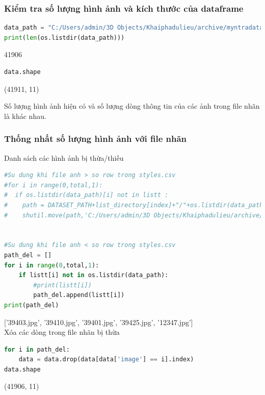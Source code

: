 \subsubsection{Kiểm tra số lượng hình ảnh và kích thước của dataframe}
\begin{lstlisting}[language = python]
data_path = "C:/Users/admin/3D Objects/Khaiphadulieu/archive/myntradataset/images"
print(len(os.listdir(data_path)))
\end{lstlisting}
41906

\begin{lstlisting}[language = python]
data.shape
\end{lstlisting}
(41911, 11)

\begin{remark}
Số lượng hình ảnh hiện có và số lượng dòng thông tin của các ảnh trong file nhãn là khác nhau.
\end{remark}


\subsubsection{Thống nhất số lượng hình ảnh với file nhãn}
Danh sách các hình ảnh bị thừa/thiếu
\begin{lstlisting}[language = python]
#Su dung khi file anh > so row trong styles.csv
#for i in range(0,total,1):
#  if os.listdir(data_path)[i] not in listt :
#    path = DATASET_PATH+list_directory[index]+"/"+os.listdir(data_path)[i]    
#    shutil.move(path,'C:/Users/admin/3D Objects/Khaiphadulieu/archive/')


#Su dung khi file anh < so row trong styles.csv
path_del = []
for i in range(0,total,1):
    if listt[i] not in os.listdir(data_path):
        #print(listt[i])
        path_del.append(listt[i])
print(path_del)
\end{lstlisting}
['39403.jpg', '39410.jpg', '39401.jpg', '39425.jpg', '12347.jpg']\\

Xóa các dòng trong file nhãn bị thừa
\begin{lstlisting}[language = python]
for i in path_del:
    data = data.drop(data[data['image'] == i].index)
data.shape
\end{lstlisting}
(41906, 11)

